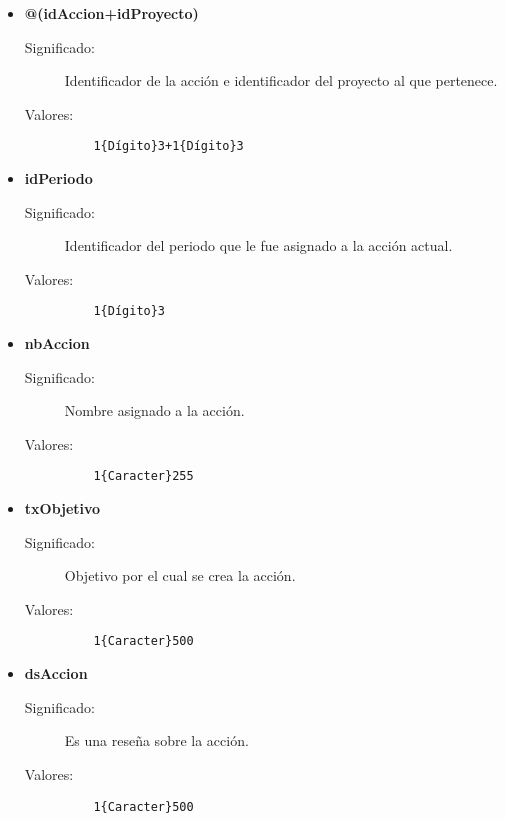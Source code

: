  \begin{itemize}

     \item \textbf{@(idAccion+idProyecto)}
      \begin{description}
        \item [Significado:] Identificador de la acción e identificador del proyecto al que pertenece.
        \item [Valores:]{\begin{lstlisting}
	1{Dígito}3+1{Dígito}3\end{lstlisting}}\end{description}

    \item \textbf{idPeriodo}
      \begin{description}
        \item [Significado:] Identificador del periodo que le fue asignado a la acción actual.
        \item [Valores:]{\begin{lstlisting}
	1{Dígito}3\end{lstlisting}}\end{description}

    \item \textbf{nbAccion}
      \begin{description}
        \item [Significado:] Nombre asignado a la acción.
        \item [Valores:]{\begin{lstlisting}
	1{Caracter}255\end{lstlisting}}\end{description}

    \item \textbf{txObjetivo}
      \begin{description}
        \item [Significado:] Objetivo por el cual se crea la acción.
        \item [Valores:]{\begin{lstlisting}
	1{Caracter}500\end{lstlisting}}\end{description}

    \item \textbf{dsAccion}
      \begin{description}
        \item [Significado:] Es una reseña sobre la acción.
        \item [Valores:]{\begin{lstlisting}
	1{Caracter}500\end{lstlisting}}\end{description}

\end{itemize}

